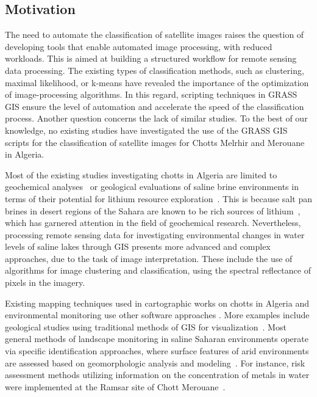 \documentclass[asi,article,accept,pdftex,moreauthors]{Definitions/mdpi}
\begin{document}
\subsection{Motivation}

The need to automate the classification of satellite images {raises the question} of developing tools that enable automated image processing, with reduced workloads. {This is aimed at building} a structured workflow for remote sensing data processing. {The }existing types of classification methods, {such as }clustering, maximal likelihood, {or} k-means have revealed the importance of the optimization of image-processing algorithms. {In this regard, }scripting techniques in GRASS GIS ensure {the level} of {automation } and accelerate the speed of the classification process. {Another question concerns the lack of similar studies. To the best of our knowledge, no existing studies have investigated the use of the GRASS GIS scripts for the classification of satellite images for Chotts Melrhir and Merouane in Algeria.}

{Most} of the existing studies investigating chotts in Algeria are limited to geochemical analyses~\cite{Hacini,MOULLA201264} or geological evaluations of saline brine environments in terms of their potential for lithium resource exploration~\cite{KESLER201255,FLEXER20181188}. {This is because} salt pan brines in desert regions of the Sahara are known to be rich sources of lithium~\cite{ZATOUT2020104566}{, which has garnered attention in the field of geochemical research}. Nevertheless, {processing} remote sensing data for investigating environmental changes in water levels of saline lakes {through GIS } presents more advanced and complex approaches, due to the task of image interpretation. These include the use of algorithms for image clustering and classification, {using} the spectral reflectance of pixels in the imagery.

{Existing} mapping techniques {used} in cartographic works on chotts in Algeria and environmental monitoring {use other software approaches }\cite{ABDENNOUR2020100087,OUERDACHI2012426,HADOUR2020100671}. {More }examples include geological studies using traditional methods of GIS for visualization~\cite{RAHAL2021104983,LAOUINI201959,HADDANE2017228}. Most general methods of landscape monitoring in saline Saharan {environments} operate via specific identification approaches, where surface features of arid environments are assessed based on {}geomorphologic analysis {and} modeling~\cite{Callot}. {For instance, risk assessment methods} {utilizing  information on the concentration of }metals in water were implemented at the Ramsar site of Chott Merouane~\cite{Benhaddya}. 
\end{document}
